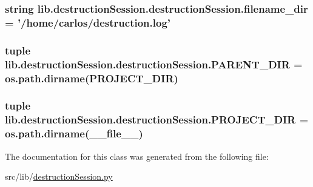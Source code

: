 \hypertarget{classlib_1_1destruction_session_1_1destruction_session_a535c5aa6dfd129bd730bf9f653496dea}{
\subsubsection[{filename\-\_\-dir}]{\setlength{\rightskip}{0pt plus 5cm}string lib.\-destruction\-Session.\-destruction\-Session.\-filename\-\_\-dir = '/home/carlos/destruction.\-log'\hspace{0.3cm}{\ttfamily [static]}}}\label{classlib_1_1destruction_session_1_1destruction_session_a535c5aa6dfd129bd730bf9f653496dea}
\hypertarget{classlib_1_1destruction_session_1_1destruction_session_a621b27bfbd63b05ee643340723f3ebbb}{
\subsubsection[{P\-A\-R\-E\-N\-T\-\_\-\-D\-I\-R}]{\setlength{\rightskip}{0pt plus 5cm}tuple lib.\-destruction\-Session.\-destruction\-Session.\-P\-A\-R\-E\-N\-T\-\_\-\-D\-I\-R = os.\-path.\-dirname({\bf P\-R\-O\-J\-E\-C\-T\-\_\-\-D\-I\-R})\hspace{0.3cm}{\ttfamily [static]}}}\label{classlib_1_1destruction_session_1_1destruction_session_a621b27bfbd63b05ee643340723f3ebbb}
\hypertarget{classlib_1_1destruction_session_1_1destruction_session_acf74736c3cfa06e4d607b7b6ca585349}{
\subsubsection[{P\-R\-O\-J\-E\-C\-T\-\_\-\-D\-I\-R}]{\setlength{\rightskip}{0pt plus 5cm}tuple lib.\-destruction\-Session.\-destruction\-Session.\-P\-R\-O\-J\-E\-C\-T\-\_\-\-D\-I\-R = os.\-path.\-dirname(\-\_\-\-\_\-file\-\_\-\-\_\-)\hspace{0.3cm}{\ttfamily [static]}}}\label{classlib_1_1destruction_session_1_1destruction_session_acf74736c3cfa06e4d607b7b6ca585349}


The documentation for this class was generated from the following file\-:\begin{DoxyCompactItemize}
\item 
src/lib/\hyperlink{destruction_session_8py}{destruction\-Session.\-py}\end{DoxyCompactItemize}
